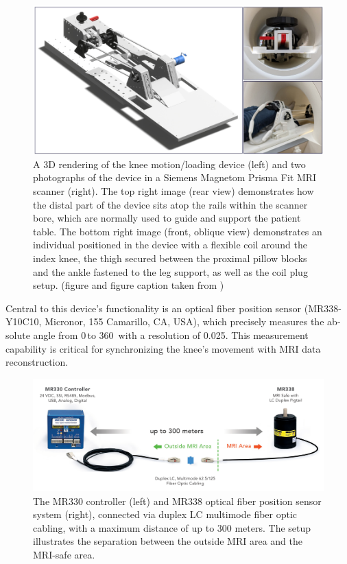 \documentclass{micro-econ-thesis}
\begin{document}
\begin{figure}[H]
	\centering
	\includegraphics[width=0.9\linewidth]{knee_device}
	\caption{A 3D rendering of the knee motion/loading device (left) and two photographs of the device in a Siemens Magnetom Prisma Fit MRI scanner (right). The top right image (rear view) demonstrates how the distal part of the device sits atop the rails within the scanner bore, which are normally used to guide and support the patient table. The bottom right image (front, oblique view) demonstrates an individual positioned in the device with a flexible coil around the index knee, the thigh secured between the proximal pillow blocks and the ankle fastened to the leg support, as well as the coil plug setup. (figure and figure caption taken from \cite{brisson_novel_2022}) }
	\label{fig:kneedevice}
\end{figure}

Central to this device's functionality is an optical fiber position sensor (MR338-Y10C10, Micronor, 155 Camarillo, CA, USA), which precisely  measures the ab­solute angle from 0{\degree}\,to 360\degree \, with a resolution of 0.025\degree \parencite{rickenbach_optical_2013}. This measurement capability is critical for synchronizing the knee's movement with MRI data reconstruction. 
\begin{figure} [H]
	\centering
	\includegraphics[width=0.7\linewidth]{sensor_img}
	\caption{The MR330 controller (left) and MR338 optical fiber position sensor system (right), connected via duplex LC multimode fiber optic cabling, with a maximum distance of up to 300 meters. The setup illustrates the separation between the outside MRI area and the MRI-safe area.}
	\label{fig:sensorimg}
\end{figure}
\end{document}

